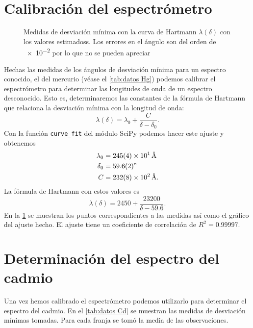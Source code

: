 \documentclass[12pt]{article}
\numberwithin{table}{section}
\numberwithin{figure}{section}
\numberwithin{equation}{section}
\newcommand{\data}[3]{\SI{#1 \pm #2}{#3}}
\begin{document}
\section{Calibración del espectrómetro}
\begin{figure}[htb]
	\small \centering \sffamily
	
	\caption{Medidas de desviación mínima con la curva de Hartmann \( \lambda(\delta) \) con los valores estimadoss. Los errores en el ángulo son del orden de \num{e-2} por lo que no se pueden apreciar}
	\label{fig:hartmann Hg}
\end{figure}

Hechas las medidas de los ángulos de desviación mínima para un espectro conocido, el del mercurio (véase el \cref{tab:datos Hg}) podemos calibrar el espectrómetro para determinar las longitudes de onda de un espectro desconocido. Esto es, determinaremos las constantes de la fórmula de Hartmann que relaciona la desviación mínima con la longitud de onda:
\begin{equation} \label{eqn:hartmann}
	\lambda(\delta) = \lambda_0 + \frac{C}{\delta - \delta_0}.
\end{equation}
Con la función \texttt{curve\_fit} del módulo \textsf{SciPy} podemos hacer este ajuste y obtenemos
\begin{equation} \label{eqn:parametros hartmann}
	\begin{aligned}
		\lambda_0 & = \data{245}{4e1}{\angstrom} \\
		\delta_0 & = \data{59.6}{0.2}{\degree} \\
		C & = \data{232}{8e2}{\angstrom}.
	\end{aligned}
\end{equation}
La fórmula de Hartmann con estos valores es 
\begin{equation} \label{eqn:hartmann con parametros}
	\lambda(\delta) = \num{2450} + \frac{\num{23200}}{\delta - \num{59.6}}.
\end{equation}
En la \cref{fig:hartmann Hg} se muestran los puntos correspondientes a las medidas así como el gráfico del ajuste hecho. El ajuste tiene un coeficiente de correlación de \( R^2 = \num{0.99997} \).

\section{Determinación del espectro del cadmio}
Una vez hemos calibrado el espectrómetro podemos utilizarlo para determinar el espectro del cadmio. En el \cref{tab:datos Cd} se muestran las medidas de desviación mínimas tomadas. Para cada franja se tomó la media de las observaciones.  
\end{document}
